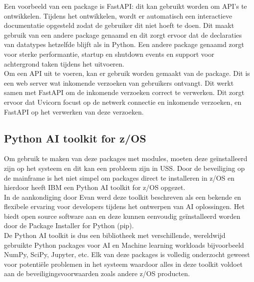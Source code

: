 Een voorbeeld van een package is FastAPI: dit kan gebruikt worden om API's te ontwikkelen. Tijdens het ontwikkelen, wordt er automatisch een interactieve documentatie opgesteld zodat de gebruiker dit niet hoeft te doen. Dit maakt gebruik van een andere package genaamd  en dit zorgt ervoor dat de declaraties van datatypes hetzelfde blijft als in Python. Een andere package genaamd  zorgt voor sterke performantie, startup en shutdown events en support voor achtergrond taken tijdens het uitvoeren. \autocite{FastAPI} \\

Om een API uit te voeren, kan er gebruik worden gemaakt van de  package. Dit is een web server wat inkomende verzoeken van gebruikers ontvangt. Dit werkt samen met FastAPI om de inkomende verzoeken correct te verwerken. Dit zorgt ervoor dat Uvicorn focust op de netwerk connectie en inkomende verzoeken, en FastAPI op het verwerken van deze verzoeken. \autocite{Sentry2024}

\subsection{Python AI toolkit for z/OS}
Om gebruik te maken van deze packages met modules, moeten deze geïnstalleerd zijn op het systeem en dit kan een probleem zijn in USS. Door de beveiliging op de mainframe is het niet simpel om packages direct te installeren in z/OS \autocite{IBM2021} en hierdoor heeft IBM een Python AI toolkit for z/OS opgezet. \\

In de aankondiging door Evan \textcite{Rivera2023} werd deze toolkit beschreven als een bekende en flexibele ervaring voor developers tijdens het ontwerpen van AI oplossingen. Het biedt open source software aan en deze kunnen eenvoudig geïnstalleerd worden door de Package Installer for Python (pip). \\

De Python AI toolkit is dus een bibliotheek met verschillende, wereldwijd gebruikte Python packages voor AI en Machine learning workloads bijvoorbeeld NumPy, SciPy, Jupyter, etc. Elk van deze packages is volledig onderzocht geweest voor potentiële problemen in het systeem waardoor alles in deze toolkit voldoet aan de beveiligingsvoorwaarden zoals andere z/OS producten. \autocite{Bostian2023}

